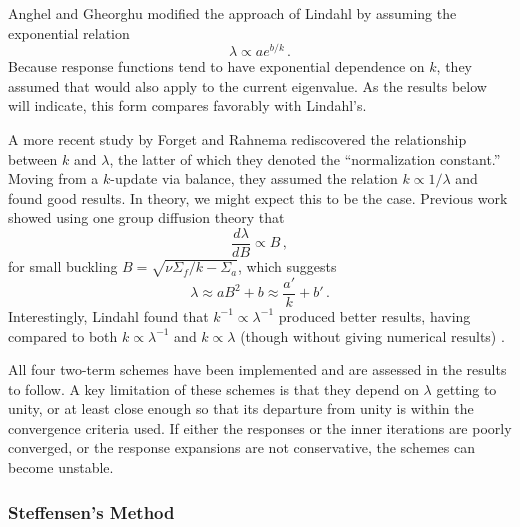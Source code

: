 Anghel and Gheorghu \cite{anghel1987isr}
modified the approach of Lindahl by assuming the 
exponential relation
\begin{equation}
  \lambda \propto a e^{b/k} \, .
\end{equation}
Because response functions tend to have exponential dependence on 
$k$, they assumed that would also apply to the current eigenvalue.  As the
results below will indicate, this form compares favorably with Lindahl's.

A more recent study by Forget and Rahnema \cite{forget2005nee} 
rediscovered the relationship
between $k$ and $\lambda$, the latter of which they denoted
the ``normalization constant.'' 
Moving from a $k$-update via balance, they assumed the relation 
$k \propto 1/\lambda$ and found good results.  In theory, we might expect 
this to be the case.  Previous work \cite{roberts2014cer} showed 
using one group diffusion theory that 
\begin{equation}
 \frac{d \lambda}{d B} \propto  B \, ,
\end{equation}
for small
buckling $B = \sqrt{\nu \Sigma_f/k - \Sigma_a}$, which
suggests
\begin{equation}
 \lambda \approx  a B^2 + b \approx \frac{a'}{k} + b' \, .
\end{equation}
Interestingly, Lindahl
found that $k^{-1} \propto \lambda^{-1}$ produced better results, having 
compared to both $k \propto \lambda^{-1}$ and $k \propto \lambda$ (though
without giving numerical results) \cite{lindahl1976mdr}.

All four two-term schemes have been implemented and are assessed in 
the results to follow.  A key limitation of these schemes is that they 
depend on $\lambda$ getting to unity, or at least close enough so that
its departure from unity is within the convergence criteria used.  If
either the responses or the inner iterations are poorly converged, or
the response expansions are not conservative, the 
schemes can become unstable.

\subsubsection{Steffensen's Method}
\label{sec:steffensensmethod}

